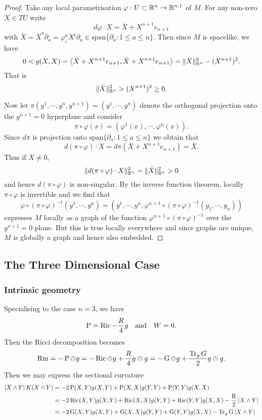 \documentclass[a4paper, 12pt]{amsart}
\begin{document}
\begin{proof}
Take any local parametrisation \(\varphi : U \subset \mathbb{R}^n \to \mathbb{R}^{n,1}\) of \(M\). For any non-zero \(X \in TU\) write
\[
d\varphi \cdot X = \bar{X} + X^{n+1} e_{n+1}
\]
with \(\bar{X} = \bar{X}^a \partial_a = \varphi^a_i X^i \partial_a \in \text{span} \{\partial_a : 1 \leq a \leq n\}\). Then since \(M\) is spacelike, we have
\[
0 < g(X, X) = \left\langle \bar{X} + X^{n+1} e_{n+1},\bar{X} + X^{n+1} e_{n+1} \right\rangle = \|\bar{X}\|_{\mathbb{R}^n}^2 - (X^{n+1})^2.
\]
That is
\[
\|\bar{X}\|_{\mathbb{R}^n}^2 > (X^{n+1})^2 \geq 0.
\]

Now let \(\pi(y^1, \cdots, y^n, y^{n+1}) = (y^1, \cdots, y^n)\) denote the orthogonal projection onto the \(y^{n+1} = 0\) hyperplane and consider
\[
\pi \circ \varphi (x) = (\varphi^1(x), \cdots, \varphi^n(x)).
\]
Since \(d \pi\) is projection onto \(\text{span} \{\partial_a : 1 \leq a \leq n\}\) we obtain that
\[
d(\pi \circ \varphi) \cdot X = d\pi (\bar{X} + X^{n+1} e_{n+1}) = \bar{X}.
\]
Thus if \(X \ne 0\),
\[
\|d(\pi \circ \varphi) \cdot X\|_{\mathbb{R}^n}^2 = \|\bar{X}\|_{\mathbb{R}^n}^2 > 0
\]
and hence \(d(\pi \circ \varphi)\) is non-singular. By the inverse function theorem, locally \(\pi \circ \varphi\) is invertible and we find that
\[
\varphi \circ (\pi \circ \varphi)^{-1} (y^1, \cdots, y^n) = (y^1, \cdots, y^n, \varphi^{n+1} \circ (\pi \circ \varphi)^{-1} (y_1, \cdots, y_n))
\]
expresses \(M\) locally as a graph of the function \(\varphi^{n+1} \circ (\pi \circ \varphi)^{-1}\) over the \(y^{n+1} = 0\) plane. But this is true locally everywhere and since graphs are unique, \(M\) is globally a graph and hence also embedded.
\end{proof}


\subsection{The Three Dimensional Case}
\label{subsec:notation_threedim}

\subsubsection{Intrinsic geometry}

Specialising to the case \(n = 3\), we have
\[
\operatorname{P} = \operatorname{Ric} - \frac{R}{4} g \quad \text{and} \quad W = 0.
\]
Then the Ricci decomposition becomes
\[
\operatorname{Rm} = -\operatorname{P} \owedge g = -\operatorname{Ric} \owedge g + \frac{R}{4} g \owedge g = -\operatorname{G} \owedge g + \frac{\operatorname{Tr}_g G}{2} g \owedge g.
\]
Then we may express the sectional curvature
\begin{align*}
\left\lvert{X \wedge Y}\right\rvert K(X \wedge Y) &= -2\operatorname{P}(X, Y) g(X, Y) + \operatorname{P}(X, X) g(Y, Y) + \operatorname{P}(Y, Y) g(X, X) \\
&= -2\operatorname{Ric}(X, Y) g(X, Y) + \operatorname{Ric}(X, X) g(Y, Y) + \operatorname{Ric}(Y, Y) g(X, X) - \frac{\operatorname{R}}{2} \left\lvert{X \wedge Y}\right\rvert \\
&= -2\operatorname{G}(X, Y) g(X, Y) + \operatorname{G}(X, X) g(Y, Y) + \operatorname{G}(Y, Y) g(X, X) - \operatorname{Tr}_g \operatorname{G} \left\lvert{X \wedge Y}\right\rvert \\
\end{align*}
\end{document}
